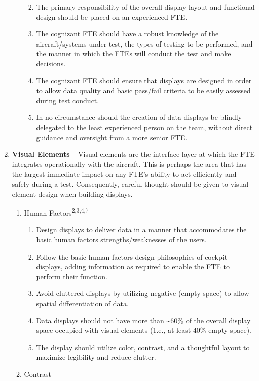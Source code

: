 \documentclass[
]{book}
\providecommand{\tightlist}{%
  \setlength{\itemsep}{0pt}\setlength{\parskip}{0pt}}
\begin{document}
\begin{enumerate}
\begin{enumerate}
    \begin{enumerate}
    \def\labelenumiii{\arabic{enumiii}.}
    \tightlist
    \item
      The primary responsibility of the overall display layout and functional design should be placed on an experienced FTE.
    \item
      The cognizant FTE should have a robust knowledge of the aircraft/systems under test, the types of testing to be performed, and the manner in which the FTEs will conduct the test and make decisions.
    \item
      The cognizant FTE should ensure that displays are designed in order to allow data quality and basic pass/fail criteria to be easily assessed during test conduct.
    \item
      In no circumstance should the creation of data displays be blindly delegated to the least experienced person on the team, without direct guidance and oversight from a more senior FTE.
    \end{enumerate}
  \end{enumerate}
\item
  \textbf{Visual Elements} -- Visual elements are the interface layer at which the FTE integrates operationally with the aircraft. This is perhaps the area that has the largest immediate impact on any FTE's ability to act efficiently and safely during a test. Consequently, careful thought should be given to visual element design when building displays.

  \begin{enumerate}
  \def\labelenumii{\alph{enumii}.}
  \item
    Human Factors\textsuperscript{2,3,4,7}

    \begin{enumerate}
    \def\labelenumiii{\arabic{enumiii}.}
    \tightlist
    \item
      Design displays to deliver data in a manner that accommodates the basic human factors strengths/weaknesses of the users.
    \item
      Follow the basic human factors design philosophies of cockpit displays, adding information as required to enable the FTE to perform their function.
    \item
      Avoid cluttered displays by utilizing negative (empty space) to allow spatial differentiation of data.
    \item
      Data displays should not have more than \textasciitilde60\% of the overall display space occupied with visual elements (1.e., at least 40\% empty space).
    \item
      The display should utilize color, contrast, and a thoughtful layout to maximize legibility and reduce clutter.
    \end{enumerate}
  \item
    Contrast


\end{enumerate}
\end{enumerate}
\end{document}
